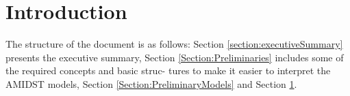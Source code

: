 \section{Introduction}


The structure of the document is as follows: Section \ref{section:executiveSummary} presents the executive summary, Section \ref{Section:Preliminaries} includes some of the required concepts and basic struc- tures to make it easier to interpret the AMIDST models, Section \ref{Section:PreliminaryModels} and Section \ref{}.